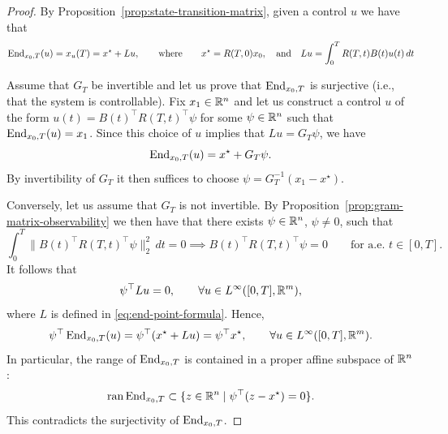 \begin{proof}
    By Proposition~\ref{prop:state-transition-matrix}, given a control $u$ we have that
    \begin{equation}
        \label{eq:end-point-formula}
        \operatorname{End}_{x_0,T}(u) = x_u(T) = x^\star + Lu,
        \qquad \text{where}\qquad
        x^\star = R(T,0)x_0,
        \quad\text{and}\quad
        Lu = \int_0^T R(T,t)B(t)u(t)\, dt
    \end{equation}


    Assume that $G_T$ be invertible and let us prove that $\operatorname{End}_{x_0,T}$ is surjective (i.e., that the system is controllable).
    Fix $x_1\in \mathbb{R}^n$ and let us construct a control $u$  of the form $u(t) = B(t)^\top R(T,t)^\top \psi$ for some $\psi\in \mathbb{R}^n$ such that $\operatorname{End}_{x_0,T}(u)=x_1$.
    Since this choice of $u$ implies that $Lu = G_T\psi$, we have
    \begin{equation}
        \operatorname{End}_{x_0,T}(u) = x^\star + G_T \psi.
    \end{equation}
    By invertibility of $G_T$ it then suffices to choose $\psi = G^{-1}_T (x_1-x^\star)$.

    Conversely, let us assume that $G_T$ is not invertible. By Proposition~\ref{prop:gram-matrix-observability} we then have that there exists $\psi\in \mathbb{R}^n$, $\psi\neq 0$, such that
    \begin{equation}
        \int_0^T \|B(t)^\top R(T,t)^\top \psi\|_2^2 \, dt = 0
        \implies
        B(t)^\top R(T,t)^\top \psi = 0 \qquad \text{for a.e.\ } t\in [0,T].
    \end{equation}
    It follows that
    \begin{equation}
        \psi^\top Lu = 0,
        \qquad \forall u\in L^\infty([0,T],\mathbb{R}^m),
    \end{equation}
    where $L$ is defined in \eqref{eq:end-point-formula}.
    Hence,
    \begin{equation}
        \psi^\top \operatorname{End}_{x_0,T}(u) = \psi^\top (x^\star + Lu) = \psi^\top x^\star, \qquad \forall u \in L^\infty([0,T],\mathbb{R}^m).
    \end{equation}
    In particular, the range of $\operatorname{End}_{x_0,T}$ is contained in a proper affine subspace of $\mathbb{R}^n$:
    \begin{equation}
        \operatorname{ran}\operatorname{End}_{x_0,T} \subset \{ z \in \mathbb{R}^n\mid \psi^\top (z-x^\star) = 0\}.
    \end{equation}
    This contradicts the surjectivity of $\operatorname{End}_{x_0,T}$.
\end{proof}

